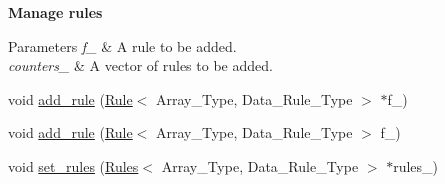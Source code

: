 \begin{Indent}\textbf{ Manage rules}\par
{\em 
\begin{DoxyParams}{Parameters}
{\em f\+\_\+} & A rule to be added. \\
\hline
{\em counters\+\_\+} & A vector of rules to be added. \\
\hline
\end{DoxyParams}
}\begin{DoxyCompactItemize}
\item 
void \hyperlink{class_support_a3113a4586c541aa25db7b4a864b748a2}{add\+\_\+rule} (\hyperlink{class_rule}{Rule}$<$ Array\+\_\+\+Type, Data\+\_\+\+Rule\+\_\+\+Type $>$ $\ast$f\+\_\+)
\item 
void \hyperlink{class_support_aa817cb5d6c48dda3ecfeef2c5897b537}{add\+\_\+rule} (\hyperlink{class_rule}{Rule}$<$ Array\+\_\+\+Type, Data\+\_\+\+Rule\+\_\+\+Type $>$ f\+\_\+)
\item 
void \hyperlink{class_support_a66dc1a0e7097d547ea9c84df777ad477}{set\+\_\+rules} (\hyperlink{class_rules}{Rules}$<$ Array\+\_\+\+Type, Data\+\_\+\+Rule\+\_\+\+Type $>$ $\ast$rules\+\_\+)
\end{DoxyCompactItemize}
\end{Indent}
